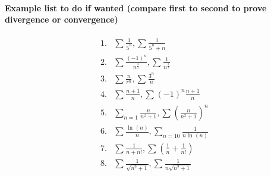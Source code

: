 \paragraph{Example list to do if wanted (compare first to second to prove divergence or convergence)}
\begin{align*}
	1.& \sum_{  } ^{  } \frac{ 1 }{ 5^{ n } } , \sum_{  } ^{  } \frac{ 1 }{ 5^{ n }+n } \\
2.&\sum_{  } ^{  } \frac{ \left( -1 \right) ^{ n } }{ n^{ \frac{ 3 }{ 2 }  } }, \sum_{  } ^{  } \frac{ 1 }{ n^{ \frac{ 3 }{ 2 }  } } \\
3.&\sum_{  } ^{  } \frac{ n }{ r^{ n } } , \sum_{  } ^{  } \frac{ 3^{ n } }{ n } \\
4.&\sum_{  } ^{  } \frac{ n+1 }{ n }, \sum_{  } ^{  } \left( -1 \right) ^{ n } \frac{ n+1 }{ n } \\
5.&\sum_{ n=1 } ^{  } \frac{ n }{ n^2+1 } , \sum_{  } ^{  } \left( \frac{ n }{ n^2+1 }  \right) ^{ n } \\
6.&\sum_{  } ^{  } \frac{ \ln^{  } \left( n \right)  }{ n }, \sum_{ n=10 } ^{  } \frac{ 1 }{ n\ln^{  } \left( n \right)  } \\
7.&\sum_{  } ^{  } \frac{ 1 }{ n+n! } , \sum_{  } ^{  } \left( \frac{ 1 }{ n } +\frac{ 1 }{ n! }  \right) \\
8.&\sum_{  } ^{  } \frac{ 1 }{ \sqrt{ n^2+1} } , \sum_{ } ^{  } \frac{ 1 }{ n\sqrt{ n^2+1} } \\
\end{align*}
